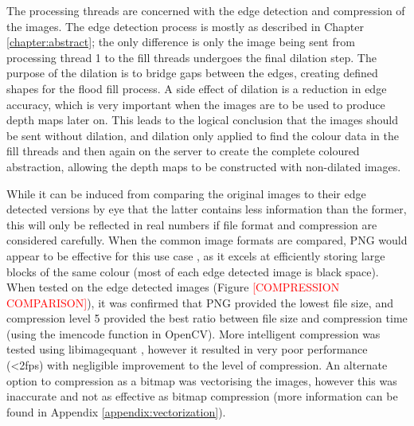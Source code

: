 The processing threads are concerned with the edge detection and compression of the images. The edge detection process is mostly as described in Chapter \ref{chapter:abstract}; the only difference is only the image being sent from processing thread 1 to the fill threads undergoes the final dilation step. The purpose of the dilation is to bridge gaps between the edges, creating defined shapes for the flood fill process. A side effect of dilation is a reduction in edge accuracy, which is very important when the images are to be used to produce depth maps later on. This leads to the logical conclusion that the images should be sent without dilation, and dilation only applied to find the colour data in the fill threads and then again on the server to create the complete coloured abstraction, allowing the depth maps to be constructed with non-dilated images. 

While it can be induced from comparing the original images to their edge detected versions by eye that the latter contains less information than the former, this will only be reflected in real numbers if file format and compression are considered carefully. When the common image formats are compared, PNG would appear to be effective for this use case \cite{aguilera2006comparison}, as it excels at efficiently storing large blocks of the same colour (most of each edge detected image is black space). When tested on the edge detected images (Figure \textcolor{red}{[COMPRESSION COMPARISON]}), it was confirmed that PNG provided the lowest file size, and compression level 5 provided the best ratio between file size and compression time (using the imencode function in OpenCV). More intelligent compression was tested using libimagequant \cite{libimagequant}, however it resulted in very poor performance (\textless2fps) with negligible improvement to the level of compression. An alternate option to compression as a bitmap was vectorising the images, however this was inaccurate and not as effective as bitmap compression (more information can be found in Appendix \ref{appendix:vectorization}).

